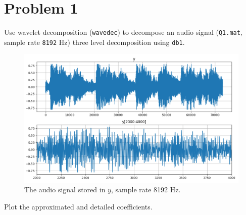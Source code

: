 \section*{Problem 1} \label{sec:problem1}


\begin{tcolorbox}[colback=red!5!white,boxrule=0pt,frame empty]
    Use wavelet decomposition (\verb|wavedec|) to decompose an audio signal (\verb|Q1.mat|, sample rate \verb|8192| Hz)
    three level decomposition using \verb|db1|.
\end{tcolorbox}

\vspace{0.5cm}

\begin{figure}[H]
    \centering
    \includegraphics[width=\textwidth]{./img/Q1.png}
    \caption{The audio signal stored in $y$, sample rate 8192 Hz.}
    \label{fig:Q1}
\end{figure}

\vspace{0.5cm}


\begin{tcolorbox}[colback=red!5!white,colframe=red!75!black,title=Problem 1.a]
    Plot the approximated and detailed coefficients.
\end{tcolorbox}


